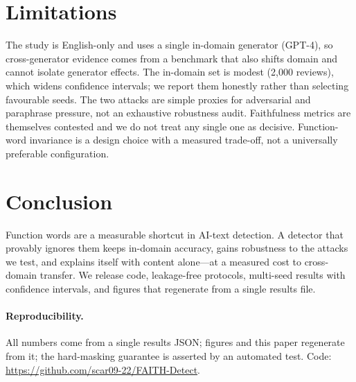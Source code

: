 \documentclass[11pt]{article}
\begin{document}
\section{Limitations}
The study is English-only and uses a single in-domain generator (GPT-4), so cross-generator evidence comes from a benchmark that also shifts domain and cannot isolate generator effects. The in-domain set is modest (2{,}000 reviews), which widens confidence intervals; we report them honestly rather than selecting favourable seeds. The two attacks are simple proxies for adversarial and paraphrase pressure, not an exhaustive robustness audit. Faithfulness metrics are themselves contested \cite{jacovi} and we do not treat any single one as decisive. Function-word invariance is a design choice with a measured trade-off, not a universally preferable configuration.
\section{Conclusion}
Function words are a measurable shortcut in AI-text detection. A detector that provably ignores them keeps in-domain accuracy, gains robustness to the attacks we test, and explains itself with content alone---at a measured cost to cross-domain transfer. We release code, leakage-free protocols, multi-seed results with confidence intervals, and figures that regenerate from a single results file.
\paragraph{Reproducibility.} All numbers come from a single results JSON; figures and this paper regenerate from it; the hard-masking guarantee is asserted by an automated test. Code: \url{https://github.com/scar09-22/FAITH-Detect}.
\appendix
\end{document}
